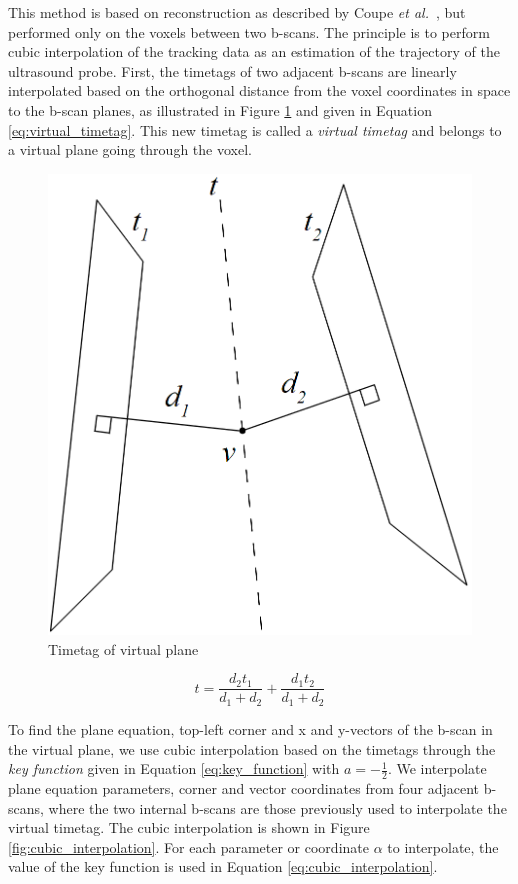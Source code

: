 	This method is based on reconstruction as described by Coupe \textit{et al.}\ \cite{coupe2005}, but performed only on the voxels between two b-scans. The principle is to perform cubic interpolation of the tracking data as an estimation of the trajectory of the ultrasound probe. First, the timetags of two adjacent b-scans are linearly interpolated based on the orthogonal distance from the voxel coordinates in space to the b-scan planes, as illustrated in Figure \ref{fig:virtual_timetag} and given in Equation \ref{eq:virtual_timetag}. This new timetag is called a \emph{virtual timetag} and belongs to a virtual plane going through the voxel.
	
	\begin{figure}[h]
	\centering
	\includegraphics[height=0.35\textheight]{graphics/virtual_timetag.png}
	\caption{Timetag of virtual plane}
	\label{fig:virtual_timetag}
	\end{figure}
	
	\begin{equation}
		\label{eq:virtual_timetag}
		t = \frac{d_2 t_1}{d_1+d_2} + \frac{d_1 t_2}{d_1+d_2}
	\end{equation}
	
	To find the plane equation, top-left corner and x and y-vectors of the b-scan in the virtual plane, we use cubic interpolation based on the timetags through the \emph{key function} given in Equation \ref{eq:key_function} with $a = -\frac{1}{2}$. We interpolate plane equation parameters, corner and vector coordinates from four adjacent b-scans, where the two internal b-scans are those previously used to interpolate the virtual timetag. The cubic interpolation is shown in Figure \ref{fig:cubic_interpolation}. For each parameter or coordinate $\alpha$ to interpolate, the value of the key function is used in Equation \ref{eq:cubic_interpolation}.
	
